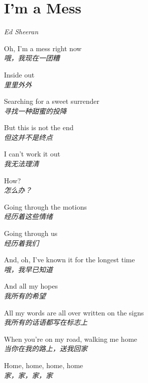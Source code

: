 \section{I'm a Mess}

\thispagestyle{empty}


\begin{center}
\textit{Ed Sheeran}
\end{center}

\vspace{1em}

\begin{spacing}{1.5}
\begin{flushleft}
Oh, I'm a mess right now\\
\textit{哦，我现在一团糟}\lyricspace

Inside out\\
\textit{里里外外}\lyricspace

Searching for a sweet surrender\\
\textit{寻找一种甜蜜的投降}\lyricspace

But this is not the end\\
\textit{但这并不是终点}\lyricspace

I can't work it out\\
\textit{我无法理清}\lyricspace

How?\\
\textit{怎么办？}\lyricspace

Going through the motions\\
\textit{经历着这些情绪}\lyricspace

Going through us\\
\textit{经历着我们}\lyricspace

And, oh, I've known it for the longest time\\
\textit{哦，我早已知道}\lyricspace

And all my hopes\\
\textit{我所有的希望}\lyricspace

All my words are all over written on the signs\\
\textit{我所有的话语都写在标志上}\lyricspace

When you're on my road, walking me home\\
\textit{当你在我的路上，送我回家}\lyricspace

Home, home, home, home\\
\textit{家，家，家，家}\lyricspace


\end{flushleft}
\end{spacing}
